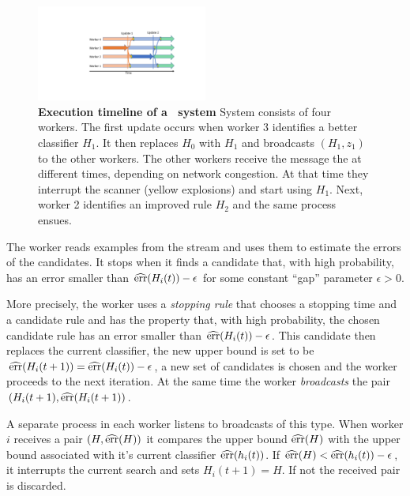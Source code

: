 \begin{figure}[t]
\begin{center}
  \includegraphics[width=0.5\textwidth]{AsyncUpdates.pdf}
\end{center}
  \caption{{\bf Execution timeline of a \tmsn\ system}
      System consists of four workers. The first update occurs when
      worker 3 identifies a better classifier $H_1$. It then replaces
      $H_0$ with $H_1$ and broadcasts $(H_1,z_1)$ to the
    other workers. The other workers receive the message the at different
    times, depending on network congestion. At that time they  interrupt the
    scanner (yellow explosions) and start using $H_1$. Next, worker 2
    identifies an improved rule $H_2$ and the same process ensues.
    \label{fig:async}}
   	\vspace{0pt}
\end{figure}

The worker reads examples from the stream and uses them to estimate
the errors of the candidates. It stops when it finds a candidate that,
with high probability, has an error smaller than
$\widehat{\mbox{err}}(H_i(t))-\epsilon$ for some constant ``gap'' parameter
$\epsilon>0$.

More precisely, the worker uses a {\em stopping rule} that chooses a
stopping time and a candidate rule and has the property that, with
high probability, the chosen candidate rule has an error smaller than
$\widehat{\mbox{err}}(H_i(t))-\epsilon$. This candidate then replaces the current
classifier, the new upper bound is set to be $\widehat{\mbox{err}}(H_i(t+1)) =
\widehat{\mbox{err}}(H_i(t))-\epsilon$, a new set of candidates is chosen and the
worker proceeds to the next iteration. At the same time the worker
{\em broadcasts} the pair $(H_i(t+1), \widehat{\mbox{err}}(H_i(t+1))$.

A separate process in each worker listens to broadcasts of this
type. When worker $i$ receives a pair $(H,\widehat{\mbox{err}}(H))$ it compares the
upper bound $\widehat{\mbox{err}}(H)$ with the upper bound associated with it's
current classifier $\widehat{\mbox{err}}(h_i(t))$. If $\widehat{\mbox{err}}(H) < \widehat{\mbox{err}}(h_i(t))-\epsilon$,
it interrupts the current search and sets $H_i(t+1)=H$. If not the
received pair is discarded.

